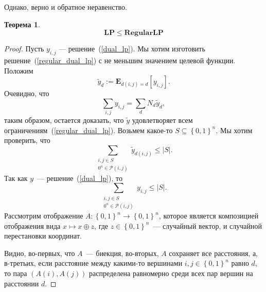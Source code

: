 \documentclass[12pt]{article}
\newcommand{\set}[1]{\left\{#1\right\}}
\newcommand{\abs}[1]{\left|#1\right|}
\newcommand{\zo}{\set{0, 1}}
\newcommand{\Pc}{\mathcal{P}}
\newcommand{\Exp}[2]{\mathbf{E}_{#1}\left[#2\right]}
\newtheorem{theorem}{Теорема}
\begin{document}
    Однако, верно и обратное неравенство.
    \begin{theorem}
        $$
            \mathbf{LP} \leq \mathbf{RegularLP}
        $$
    \end{theorem}
    \begin{proof}
        Пусть $y_{i,j}$ --- решение~(\ref{dual_lp}). Мы хотим изготовить решение~(\ref{regular_dual_lp}) с не меньшим значением целевой функции.
        Положим
        $$
            \tilde{y}_d := \Exp{d(i, j) = d}{y_{i,j}}.
        $$
        Очевидно, что
        $$
            \sum_{i,j}y_{i,j} = \sum_d N_d \tilde{y}_d,
        $$
        таким образом, остается доказать, что $\tilde{y}$ удовлетворяет
        всем ограничениям~(\ref{regular_dual_lp}).
        Возьмем какое-то $S \subseteq \zo^n$. Мы хотим проверить, что
        \begin{equation}
            \label{regular_constraint}
            \sum_{\begin{smallmatrix}i, j \in S \\ 0^n \in \Pc(i, j)\end{smallmatrix}}
            \tilde{y}_{d(i, j)} \leq \abs{S}.
        \end{equation}
        Так как $y$~--- решение~(\ref{dual_lp}), то 
        $$
            \sum_{\begin{smallmatrix}i, j \in S \\ 0^n \in \Pc(i, j)\end{smallmatrix}}
            y_{i, j} \leq \abs{S}.
        $$
        Рассмотрим отображение $A \colon \zo^n \to \zo^n$, которое является композицией отображения вида $x \mapsto x \oplus z$, где $z \in \zo^n$~--- случайный вектор,
        и случайной перестановки координат.

        Видно, во-первых, что $A$~--- биекция, во-вторых, $A$ сохраняет
        все расстояния,
        а, в-третьих, если расстояние между какими-то вершинами $i, j \in \zo^n$
        равно $d$, то пара $(A(i), A(j))$ распределена равномерно среди всех пар
        вершин на расстоянии $d$.


\end{proof}
\end{document}

